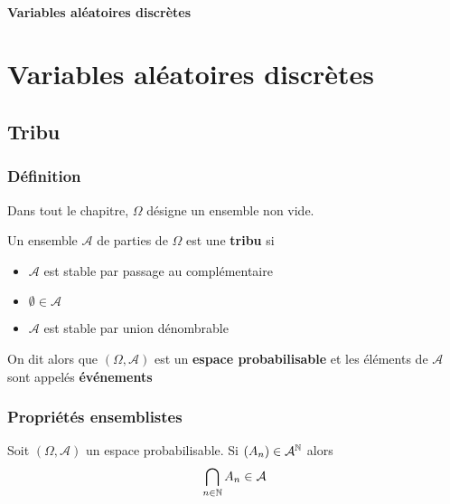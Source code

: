 \ifsolo
    ~

    \vspace{1cm}

    \begin{center}
        \textbf{\LARGE Variables aléatoires discrètes} \\[1em]
    \end{center}
    \tableofcontents
\else
    \chapter{Variables aléatoires discrètes}

    \minitoc
\fi
\thispagestyle{empty}

\section{Tribu}
\subsection{Définition}

Dans tout le chapitre, $\Omega$ désigne un ensemble non vide.

\begin{dfn}
    Un ensemble $\mathcal A$ de parties de $\Omega$ est une \textbf{tribu} si \begin{itemize}
        \item $ \mathcal A$ est stable par passage au complémentaire
        \item $\emptyset \in \mathcal A$
        \item $ \mathcal A$ est stable par union dénombrable
    \end{itemize}
    On dit alors que $(\Omega, \mathcal A)$ est un \textbf{espace probabilisable}  et les éléments de $\mathcal A$ sont appelés  \textbf{événements} 
\end{dfn}


\subsection{Propriétés ensemblistes}

\begin{prop}
    Soit $(\Omega, \mathcal A)$ un espace probabilisable. Si $(A_n)\in \mathcal A^{\mathbb N}$ alors \[
        \bigcap_{n\in\mathbb N}A_n \in \mathcal A
    \]
\end{prop}


